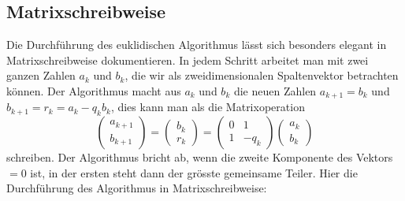 \subsection{Matrixschreibweise
\label{buch:endlichekoerper:subsection:matrixschreibweise}}
Die Durchführung des euklidischen Algorithmus lässt sich besonders elegant
in Matrixschreibweise dokumentieren.
In jedem Schritt arbeitet man mit zwei ganzen Zahlen $a_k$ und $b_k$, die wir
als zweidimensionalen Spaltenvektor betrachten können.
Der Algorithmus macht aus $a_k$ und $b_k$ die neuen Zahlen
$a_{k+1} = b_k$ und $b_{k+1} = r_k = a_k - q_kb_k$, dies
kann man als die Matrixoperation
\[
\begin{pmatrix} a_{k+1} \\ b_{k+1} \end{pmatrix}
=
\begin{pmatrix} b_k \\ r_k \end{pmatrix}
=
\begin{pmatrix} 0 & 1 \\ 1 & -q_k \end{pmatrix}
\begin{pmatrix} a_{k} \\ b_{k} \end{pmatrix}
\]
schreiben.
Der Algorithmus bricht ab, wenn die zweite Komponente des Vektors $=0$ ist,
in der ersten steht dann der grösste gemeinsame Teiler.
Hier die Durchführung des Algorithmus in Matrixschreibweise:
